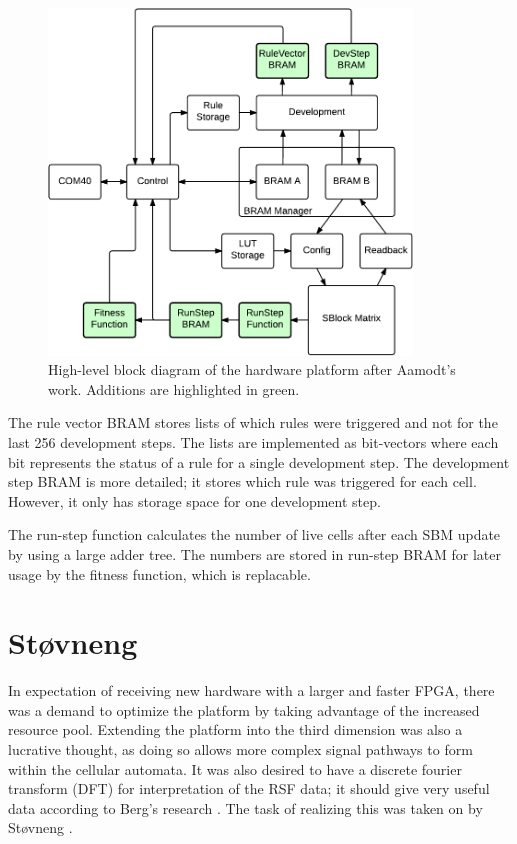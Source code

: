 \begin{figure}[!ht]
    \centering
    \includegraphics[width=0.86\textwidth]{figures/overview-aamodt}
    \caption[Aamodt's hardware design.]{
        High-level block diagram of the hardware platform after Aamodt's work.
        Additions are highlighted in green.
    }
    \label{fig:overview-aamodt}
\end{figure}

The rule vector BRAM stores lists of which rules were triggered and not for the last 256 development steps.
The lists are implemented as bit-vectors where each bit represents the status of a rule for a single development step.
The development step BRAM is more detailed; it stores which rule was triggered for each cell.
However, it only has storage space for one development step.

The run-step function calculates the number of live cells after each SBM update by using a large adder tree.
The numbers are stored in run-step BRAM for later usage by the fitness function, which is replacable.


\section{Støvneng}

In expectation of receiving new hardware with a larger and faster FPGA, there was a demand to optimize the platform by taking advantage of the increased resource pool.
Extending the platform into the third dimension was also a lucrative thought, as doing so allows more complex signal pathways to form within the cellular automata.
It was also desired to have a discrete fourier transform (DFT) for interpretation of the RSF data; it should give very useful data according to Berg's research \cite{berg2013ca}.
The task of realizing this was taken on by Støvneng \cite{stovneng2014sblock}.

